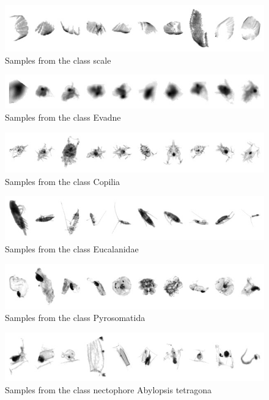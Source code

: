 \begin{figure}[h]
\includegraphics[width=\columnwidth]{collage/028_scale.jpg}\caption{Samples from the class scale }
\end{figure}
\begin{figure}[h]
\includegraphics[width=\columnwidth]{collage/029_Evadne.jpg}\caption{Samples from the class Evadne }
\end{figure}
\begin{figure}[h]
\includegraphics[width=\columnwidth]{collage/030_Copilia.jpg}\caption{Samples from the class Copilia }
\end{figure}
\begin{figure}[h]
\includegraphics[width=\columnwidth]{collage/031_Eucalanidae.jpg}\caption{Samples from the class Eucalanidae }
\end{figure}
\begin{figure}[h]
\includegraphics[width=\columnwidth]{collage/032_Pyrosomatida.jpg}\caption{Samples from the class Pyrosomatida }
\end{figure}
\begin{figure}[h]
\includegraphics[width=\columnwidth]{collage/033_nectophore__Abylopsis_tetragona.jpg}\caption{Samples from the class nectophore  Abylopsis tetragona }
\end{figure}
